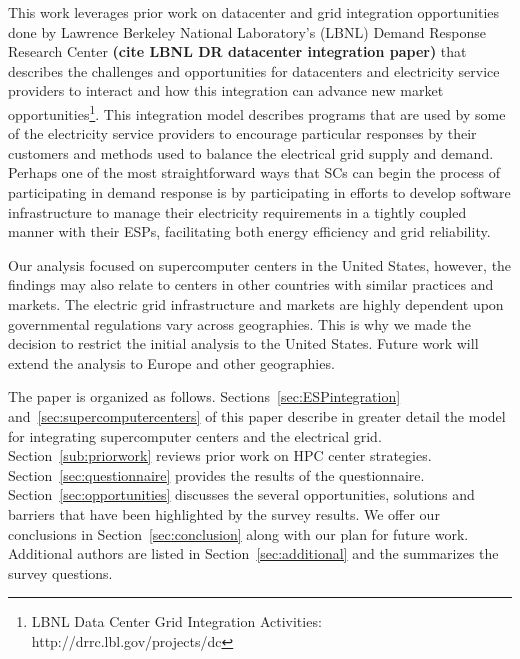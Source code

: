 This work leverages prior work on datacenter and grid integration opportunities
done by Lawrence Berkeley National Laboratory's (LBNL) Demand Response 
Research Center \textbf{(cite LBNL DR datacenter integration paper)}
that describes the challenges and opportunities for datacenters and electricity
service providers to interact and how this integration can advance 
new market 
opportunities\footnote{LBNL Data Center Grid Integration Activities: http://drrc.lbl.gov/projects/dc}.
This integration model describes programs that are used by some of the electricity 
service providers to encourage particular responses by their customers and methods 
used to balance the electrical grid supply and demand.
Perhaps one of the most straightforward ways that SCs can begin
the process of participating in demand response is by participating in efforts to
develop software
infrastructure to manage their electricity requirements in a tightly coupled manner 
with their ESPs, facilitating both energy efficiency and grid reliability.

Our analysis focused on supercomputer centers in the United States, however, the 
findings may also relate to centers in other countries with similar practices and markets.  
The electric grid infrastructure and markets are highly dependent upon governmental regulations 
vary across geographies.  This is why we made the decision to restrict the initial analysis to the United States.  
Future work will extend the analysis to Europe and other geographies.

The paper is organized as follows.
Sections~\ref{sec:ESPintegration} and~\ref{sec:supercomputercenters} of this paper
describe in greater detail the model for 
integrating supercomputer centers and the electrical grid.
Section~\ref{sub:priorwork}
reviews prior work on HPC center strategies. Section~\ref{sec:questionnaire}
provides the results of the questionnaire. 
Section~\ref{sec:opportunities} 
discusses the several opportunities, solutions and barriers that have been highlighted
by the survey results. We offer our conclusions in Section~\ref{sec:conclusion} along with our plan for future work.  Additional authors are listed in Section~\ref{sec:additional} and
the  summarizes the survey questions.
